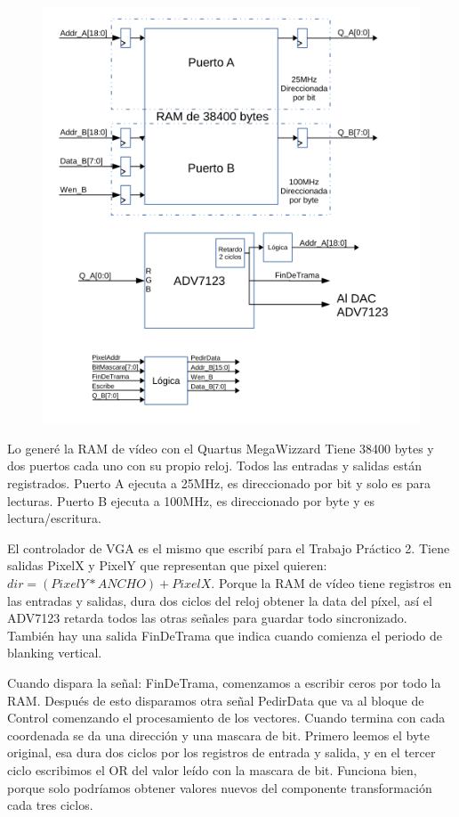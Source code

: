 \documentclass[a4paper]{article}
\begin{document}
\begin{figure}[!h]
\includegraphics[width=15cm]{img/video_subsystem.png}
\label{fig:video_subsystem}
\end{figure}

Lo generé la RAM de vídeo con el Quartus MegaWizzard Tiene 38400 bytes y dos puertos cada uno con su propio reloj. Todos las entradas y salidas están registrados. Puerto A ejecuta a 25MHz, es direccionado por bit y solo es para lecturas. Puerto B ejecuta a 100MHz, es direccionado por byte y es lectura/escritura.

El controlador de VGA es el mismo que escribí para el Trabajo Práctico 2. Tiene salidas PixelX y PixelY que representan que pixel quieren: $ dir = (PixelY * ANCHO) + PixelX $. Porque la RAM de vídeo tiene registros en las entradas y salidas, dura dos ciclos del reloj obtener la data del píxel, así el ADV7123 retarda todos las otras señales para guardar todo sincronizado. También hay una salida FinDeTrama que indica cuando comienza el periodo de blanking vertical.

Cuando dispara la señal: FinDeTrama, comenzamos a escribir ceros por todo la RAM. Después de esto disparamos otra señal PedirData que va al bloque de Control comenzando el procesamiento de los vectores. Cuando termina con cada coordenada se da una dirección y una mascara de bit. Primero leemos el byte original, esa dura dos ciclos por los registros de entrada y salida, y en el tercer ciclo escribimos el OR del valor leído con la mascara de bit. Funciona bien, porque solo podríamos obtener valores nuevos del componente transformación cada tres ciclos.
\end{document}
